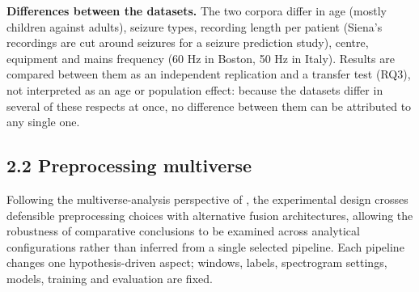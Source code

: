 \documentclass[11pt,a4paper]{article}
\begin{document}
\textbf{Differences between the datasets.} The two corpora differ in age (mostly children
against adults), seizure types, recording length per patient (Siena's
recordings are cut around seizures for a seizure prediction study), centre,
equipment and mains frequency (60 Hz in Boston, 50 Hz in Italy). Results are
compared between them as an independent replication and a transfer test (RQ3), not
interpreted as an age or population effect: because the datasets differ in several of
these respects at once, no difference between them can be attributed to any single
one.

\subsection{2.2 Preprocessing multiverse}\label{preprocessing-multiverse}

Following the multiverse-analysis perspective of \citet{Steegen_2016}, the experimental
design crosses defensible preprocessing choices with alternative fusion architectures,
allowing the robustness of comparative conclusions to be examined across analytical
configurations rather than inferred from a single selected pipeline. Each pipeline changes one hypothesis-driven aspect; windows, labels,
spectrogram settings, models, training and evaluation are fixed.

\begingroup\small
\end{document}
